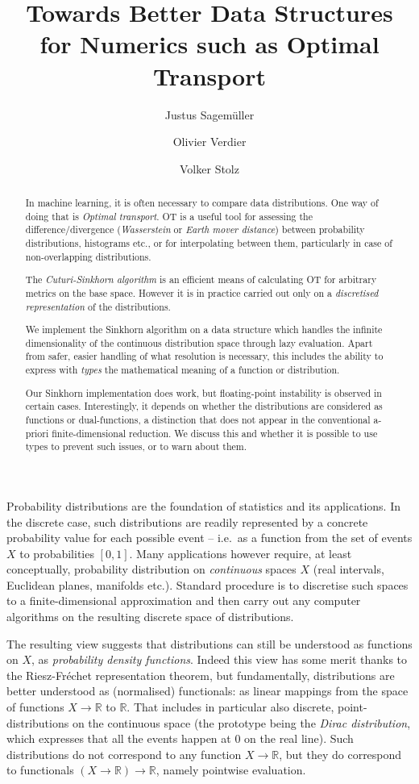 \documentclass[a4paper]{easychair}
\title{Towards Better Data Structures for Numerics such as Optimal Transport}
\author{
   Justus Sagemüller\inst{1}
\and
    Olivier Verdier\inst{1}
\and
    Volker Stolz\inst{1}
}
\institute{
  Western Norway University of Applied Sciences, 
  Bergen, Norway\\
  \email{\{jsag,over,vsto\}@hvl.no}
 }
\begin{document}
\maketitle

\begin{abstract}
  In machine learning, it is often necessary to compare data distributions. One way of doing that is \emph{Optimal transport}. OT is a useful tool for assessing the difference/divergence (\emph{Wasserstein} or \emph{Earth mover distance}) between probability distributions, histograms etc., or for interpolating between them, particularly in case of non-overlapping distributions.
  
  The \emph{Cuturi-Sinkhorn algorithm} is an efficient means of calculating OT for arbitrary metrics on the base space. However it is in practice carried out only on a \emph{discretised representation} of the distributions.
  
  We implement the Sinkhorn algorithm on a data structure which handles the infinite dimensionality of the continuous distribution space through lazy evaluation. Apart from safer, easier handling of what resolution is necessary, this includes the ability to express with \emph{types} the mathematical meaning of a function or distribution.
  
  Our Sinkhorn implementation does work, but floating-point instability is observed in certain cases. Interestingly, it depends on whether the distributions are considered as functions or dual-functions, a distinction that does not appear in the conventional a-priori finite-dimensional reduction. We discuss this and whether it is possible to use types to prevent such issues, or to warn about them.
\end{abstract}

\label{sec:introduction}
\noindent%
Probability distributions are the foundation of statistics and its applications. In the discrete case, such distributions are readily represented by a concrete probability value for each possible event -- i.e.\ as a function from the set of events $X$ to probabilities $[0,1]$.
Many applications however require, at least conceptually, probability distribution on \emph{continuous} spaces $X$ (real intervals, Euclidean planes, manifolds etc.).
Standard procedure is to discretise such spaces to a finite-dimensional approximation and then carry out any computer algorithms on the resulting discrete space of distributions. 

The resulting view suggests that distributions can still be understood as functions on $X$, as \emph{probability density functions}. Indeed this view has some merit thanks to the Riesz-Fréchet representation theorem, but fundamentally, distributions are better understood as (normalised) function{al}s: as linear mappings from the space of functions $X\to\mathbb{R}$ to $\mathbb{R}$.
That includes in particular also discrete, point-distributions on the continuous space (the prototype being the \emph{Dirac distribution}, which expresses that all the events happen at 0 on the real line). Such distributions do not correspond to any function $X\to\mathbb{R}$, but they do correspond to functionals $(X\to\mathbb{R})\to\mathbb{R}$, namely pointwise evaluation.
\end{document}
